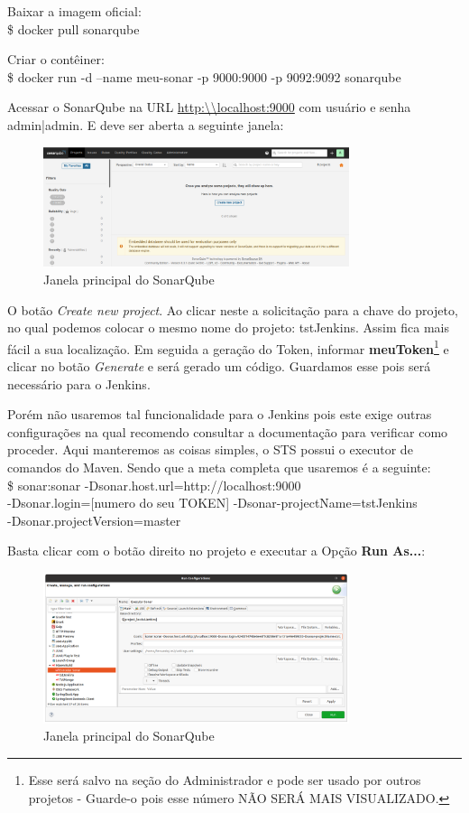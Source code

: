 \documentclass[a4paper,11pt]{article}
\begin{document}
Baixar a imagem oficial: \\
{\ttfamily\$ docker pull sonarqube}

Criar o contêiner: \\
{\ttfamily\$ docker run -d --name meu-sonar -p 9000:9000 -p 9092:9092 sonarqube}

Acessar o SonarQube na URL \url{http:\\localhost:9000} com usuário e senha admin|admin. E deve ser aberta a seguinte janela:
\begin{figure}[H]
	\centering
	\includegraphics[width=0.8\textwidth]{imagens/sonar.png}
	\caption{Janela principal do SonarQube}
\end{figure}

O botão \textit{Create new project}. Ao clicar neste a solicitação para a chave do projeto, no qual podemos colocar o mesmo nome do projeto: tstJenkins. Assim fica mais fácil a sua localização. Em seguida a geração do Token, informar \textbf{meuToken}\footnote{Esse será salvo na seção do Administrador e pode ser usado por outros projetos - Guarde-o pois esse número NÃO SERÁ MAIS VISUALIZADO.} e clicar no botão \textit{Generate} e será gerado um código. Guardamos esse pois será necessário para o Jenkins.

Porém não usaremos tal funcionalidade para o Jenkins pois este exige outras configurações na qual recomendo consultar a documentação para verificar como proceder. Aqui manteremos as coisas simples, o STS possui o executor de comandos do Maven. Sendo que a meta completa que usaremos é a seguinte: \\
{\ttfamily\$ sonar:sonar -Dsonar.host.url=http://localhost:9000 \\ 
	-Dsonar.login=[numero do seu TOKEN] -Dsonar-projectName=tstJenkins \\
	-Dsonar.projectVersion=master}

Basta clicar com o botão direito no projeto e executar a Opção \textbf{Run As...}:
\begin{figure}[H]
	\centering
	\includegraphics[width=0.8\textwidth]{imagens/sonarSTS.png}
	\caption{Janela principal do SonarQube}
\end{figure}
\end{document}
